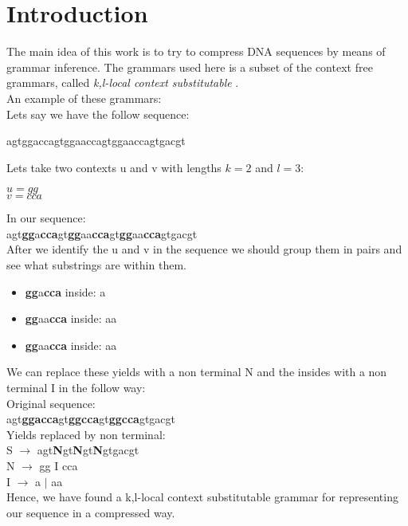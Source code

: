 \chapter{Introduction}

The main idea of this work is to try to compress DNA sequences by means of
grammar inference. The grammars used here is a subset of the context free grammars,
called \emph{k,l-local context substitutable} \cite{Gaelle}. \\

An example of these grammars:\\
Lets say we have the follow sequence: \\
\begin{center}
agtggaccagtggaaccagtggaaccagtgacgt
\end{center}

Lets take two contexts u and v with lengths $k=2$ and $l=3$: \\
\begin{center}
$u = gg$\\
$v = cca$
\end{center}

In our sequence:\\
agt\textbf{gg}a\textbf{cca}gt\textbf{gg}aa\textbf{cca}gt\textbf{gg}aa\textbf{cca}gtgacgt \\

After we identify the u and v in the sequence we should group them in pairs and
see what substrings are within them.
\begin{itemize}
	\item \textbf{gg}a\textbf{cca} inside: a
	\item \textbf{gg}aa\textbf{cca} inside: aa
	\item \textbf{gg}aa\textbf{cca} inside: aa
\end{itemize}

We can replace these yields with a non terminal N and the insides with a non terminal I 
in the follow way:\\

Original sequence:\\
agt\textbf{ggacca}gt\textbf{ggcca}gt\textbf{ggcca}gtgacgt \\

Yields replaced by non terminal: \\
S $\rightarrow$ agt\textbf{N}gt\textbf{N}gt\textbf{N}gtgacgt \\
N $\rightarrow$ gg I cca\\
I $\rightarrow$ a $|$ aa\\

Hence, we have found a k,l-local context substitutable grammar for representing
our sequence in a compressed way.